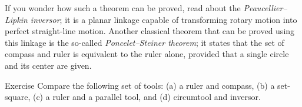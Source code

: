 If you wonder how such a theorem can be proved, read about the \emph{Peaucellier--Lipkin inversor};
it is a planar linkage capable of transforming rotary motion into perfect straight-line motion.
Another classical theorem that can be proved using this linkage is the so-called \emph{Poncelet--Steiner theorem};
it states that the set of compass and ruler is equivalent to the ruler alone, provided that a single circle and its center are given.

\begin{thm}{Exercise}\label{ex:comparison}
Compare the following set of tools:
(a) a ruler and compass, 
(b) a set-square, 
(c) a ruler and a parallel tool,
and
(d) circumtool and inversor.
\end{thm}


